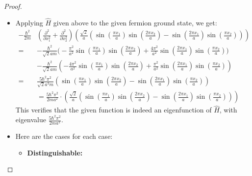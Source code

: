 \documentclass{article}
\begin{document}
\begin{proof}
    
    \hfil

    \begin{itemize}
        \item[(a)] Applying $\hat{H}$ given above to the given fermion ground state, we get:
        \begin{align}
            -\frac{\hbar^2}{2m}&\left(\frac{\partial^2}{\partial x_1^2}+\frac{\partial^2}{\partial x_2^2}\right)\left(\frac{\sqrt{2}}{a}\left(\sin\left(\frac{\pi x_1}{a}\right)\sin\left(\frac{2\pi x_2}{a}\right)-\sin\left(\frac{2\pi x_1}{a}\right)\sin\left(\frac{\pi x_2}{a}\right)\right)\right)\\
            =& -\frac{\hbar^2}{\sqrt{2} am}\bigg(-\frac{\pi^2}{a^2}\sin\left(\frac{\pi x_1}{a}\right)\sin\left(\frac{2\pi x_2}{a}\right) + \frac{4\pi^2}{a^2}\sin\left(\frac{2\pi x_1}{a}\right)\sin\left(\frac{\pi x_2}{a}\right)\bigg)\\ 
            &-\frac{\hbar^2}{\sqrt{2}am}\left(- \frac{4\pi^2}{a^2}\sin\left(\frac{\pi x_1}{a}\right)\sin\left(\frac{2\pi x_2}{a}\right) + \frac{\pi^2}{a^2}\sin\left(\frac{2\pi x_1}{a}\right)\sin\left(\frac{\pi x_2}{a}\right)\right)\\
            =& \frac{5\hbar^2\pi^2}{\sqrt{2}a^3m}\left(\sin\left(\frac{\pi x_1}{a}\right)\sin\left(\frac{2\pi x_2}{a}\right)-\sin\left(\frac{2\pi x_1}{a}\right)\sin\left(\frac{\pi x_2}{a}\right)\right)\\
            &= \frac{5\hbar^2\pi^2}{2ma^2}\cdot \left(\frac{\sqrt{2}}{a}\left(\sin\left(\frac{\pi x_1}{a}\right)\sin\left(\frac{2\pi x_2}{a}\right)-\sin\left(\frac{2\pi x_1}{a}\right)\sin\left(\frac{\pi x_2}{a}\right)\right)\right)
        \end{align}
        This verifies that the given function is indeed an eigenfunction of $\hat{H}$, with eigenvalue $\frac{5\hbar^2\pi^2}{2ma^2}$.

        \hfil

        \item[(b)] Here are the cases for each case:
        \begin{itemize}
            \item \textbf{Distinguishable:}
            

\end{itemize}
\end{itemize}
\end{proof}
\end{document}
